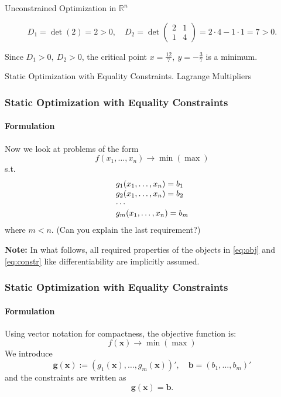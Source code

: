 \documentclass[10pt]{beamer}
\theoremstyle{definition}
\begin{document}
\begin{section}{Unconstrained Optimization in $ \mathbb{R}^n $}
\begin{frame}[fragile]
\begin{example}
\[ D_1 = \det (2) = 2>0, \quad D_2 = \det \begin{pmatrix}
2 & 1\\
1 & 4
\end{pmatrix} = 2 \cdot 4 - 1 \cdot 1 = 7 > 0. \]

Since $ D_1>0,~D_2>0 $, the critical point $ x=\frac{12}{7},~y=-\frac{3}{7} $ is a minimum.
\label{ex:locminR2cont}
\end{example}

\end{frame}
\end{section}


\begin{section}{Static Optimization with Equality Constraints. Lagrange Multipliers}\label{sec:Lagr}

\begin{frame}[fragile]
\frametitle{Static Optimization with Equality Constraints}
\framesubtitle{Formulation}
Now we look at problems of the form
\begin{equation}
f(x_1,\ldots,x_n)\rightarrow \min (\max)
\label{eq:obj}
\end{equation}
s.t.
\begin{equation}
\begin{array}{l l l}
g_1(x_1,\ldots,x_n) = b_1\\
g_2(x_1,\ldots,x_n) = b_2\\
\cdots \\
g_m(x_1,\ldots,x_n) = b_m\\
\end{array}
\label{eq:constr}
\end{equation}
where $ m<n $. (Can you explain the last requirement?) \bigskip

\textbf{Note:} In what follows, all required properties of the objects in \eqref{eq:obj} and \eqref{eq:constr} like differentiability are implicitly assumed.
\end{frame}

\begin{frame}[fragile]
\frametitle{Static Optimization with Equality Constraints}
\framesubtitle{Formulation}
Using vector notation for compactness, the objective function is:
\[ f(\mathbf{x}) \rightarrow \min (\max) \]
We introduce
\[ \mathbf{g}(\mathbf{x}):= (g_1(\mathbf{x}),\ldots,g_m(\mathbf{x}))',\quad \mathbf{b} = (b_1,\ldots,b_m)' \]
and the constraints are written as 
\[ \mathbf{g}(\mathbf{x})=\mathbf{b}. \]
\end{frame}


\end{section}
\end{document}
